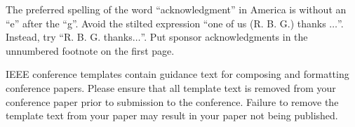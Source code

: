 \documentclass[conference]{IEEEtran}
\begin{document}
The preferred spelling of the word ``acknowledgment'' in America is without 
an ``e'' after the ``g''. Avoid the stilted expression ``one of us (R. B. 
G.) thanks $\ldots$''. Instead, try ``R. B. G. thanks$\ldots$''. Put sponsor 
acknowledgments in the unnumbered footnote on the first page.





\printbibliography  %



\vspace{12pt}
\color{red}
IEEE conference templates contain guidance text for composing and formatting conference papers. Please ensure that all template text is removed from your conference paper prior to submission to the conference. Failure to remove the template text from your paper may result in your paper not being published.
\end{document}
